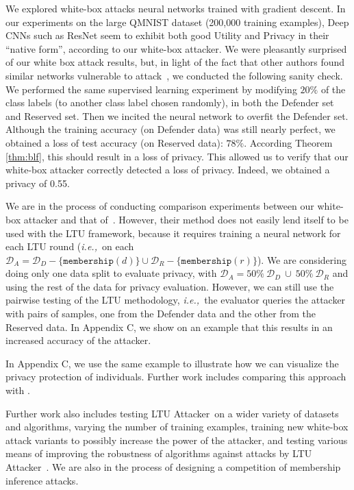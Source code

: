 \documentclass[letterpaper]{article}
\newcommand{\sminus}{-}
\newcommand{\ie}{{\em i.e.,~}}
\newcommand{\oracle}{LTU Attacker~}
\begin{document}
We explored white-box attacks neural networks trained with gradient descent. In our experiments on the large QMNIST dataset (200,000 training examples),
Deep CNNs such as ResNet seem to exhibit both good Utility and Privacy in their ``native form'', according to our white-box attacker. 
We were pleasantly surprised of our white box attack results, but, in light of the fact that other authors found similar networks vulnerable to attack~\cite{nasr2019comprehensive}, we conducted the following sanity check.
We performed the same supervised learning experiment by modifying \(20\%\) of the class labels (to another class label chosen randomly), in both the Defender set and Reserved set. Then we incited the neural network to overfit the Defender set. Although the training accuracy (on Defender data) was still nearly perfect, we obtained a loss of test accuracy (on Reserved data): $78\%$. According Theorem \ref{thm:blf}, this should result in a loss of privacy. This allowed us to verify that our white-box attacker correctly detected a loss of privacy. Indeed, we obtained a privacy of 0.55.

We are in the process of conducting comparison experiments between our white-box attacker and that of~\cite{nasr2019comprehensive}. However, their method does not easily lend itself to be used with the LTU framework, because it requires training a neural network for each LTU round (\ie on each $\mathcal{D}_A=\mathcal{D}_D\sminus\{\texttt{membership}(d)\} \cup \mathcal{D}_R\sminus\{\texttt{membership}(r)\}$). We are considering doing only one data split to evaluate privacy, with $\mathcal{D}_A=50\%~ \mathcal{D}_D~\cup~50\%~\mathcal{D}_R$ and using the rest of the data for privacy evaluation. However, we can still use the pairwise testing of the LTU methodology, \ie the evaluator queries the attacker with pairs of samples, one from the Defender data and the other from the Reserved data. In Appendix C, we show on an example that this results in an increased accuracy of the attacker.

In Appendix C, we use the same example to illustrate how we can visualize the privacy protection of individuals. Further work includes comparing this approach with
\cite{song2021systematic}.

Further work also includes testing \oracle on a wider variety of datasets and algorithms, varying the number of training examples, training new white-box attack variants to possibly increase the power of the attacker, and testing various means of improving the robustness of algorithms against attacks by \oracle. We are also in the process of designing a competition of membership inference attacks.
\end{document}
